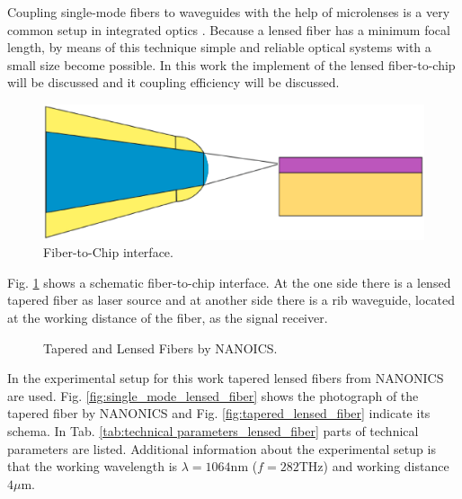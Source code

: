 Coupling single-mode fibers to waveguides with the help of microlenses is a very common setup in integrated optics \cite{integrated_optics}. Because a lensed fiber has a minimum focal length, by means of this technique simple and reliable optical systems with a small size become possible. In this work the implement of the lensed fiber-to-chip will be discussed and it coupling efficiency will be discussed.\\

\begin{figure}[!ht]
\centering
\includegraphics[width=.7\textwidth]{bilder/experiment_object}
\caption{Fiber-to-Chip interface.}
\label{fig:experiment_object}
\end{figure}
Fig. \ref{fig:experiment_object} shows a schematic fiber-to-chip interface. At the one side there is a lensed tapered fiber as laser source and at another side there is a rib waveguide\cite{integrated_optics}, located at the working distance of the fiber, as the signal receiver.\\
 
\begin{figure}[!ht]
\centering
{}
\hfill
{}
\label{fig:TLFs}
\caption{ Tapered and Lensed Fibers by NANOICS.}
\end{figure}
In the experimental setup for this work tapered lensed fibers from NANONICS\cite{nanoscal_tapered_fiber} are used. Fig. \ref{fig:single_mode_lensed_fiber} shows the photograph of the tapered fiber by NANONICS and Fig. \ref{fig:tapered_lensed_fiber} indicate its schema. In Tab. \ref{tab:technical parameters_lensed_fiber} parts of technical parameters are listed. Additional information about the experimental setup is that the working wavelength is $\lambda=1064$nm ($f=282$THz) and working distance $4\mu$m.\\
 
